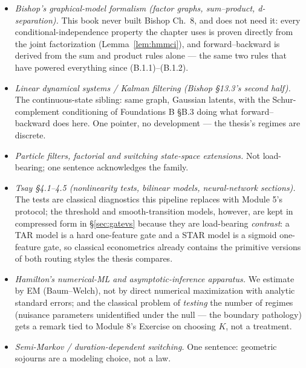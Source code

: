 \documentclass[11pt]{article}
\numberwithin{equation}{section}
\theoremstyle{plain}
\theoremstyle{definition}
\theoremstyle{remark}
\begin{document}
\begin{itemize}[leftmargin=2em,itemsep=0.15em]
\item \emph{Bishop's graphical-model formalism (factor graphs, sum--product, d-separation).} This book never built Bishop Ch.\ 8, and does not need it: every conditional-independence property the chapter uses is proven directly from the joint factorization (Lemma~\ref{lem:hmmci}), and forward--backward is derived from the sum and product rules alone --- the same two rules that have powered everything since (B.1.1)--(B.1.2).
\item \emph{Linear dynamical systems / Kalman filtering (Bishop \S13.3's second half).} The continuous-state sibling: same graph, Gaussian latents, with the Schur-complement conditioning of Foundations B \S B.3 doing what forward--backward does here. One pointer, no development --- the thesis's regimes are discrete.
\item \emph{Particle filters, factorial and switching state-space extensions.} Not load-bearing; one sentence acknowledges the family.
\item \emph{Tsay \S4.1--4.5 (nonlinearity tests, bilinear models, neural-network sections).} The tests are classical diagnostics this pipeline replaces with Module 5's protocol; the threshold and smooth-transition models, however, are kept in compressed form in \S\ref{sec:gatevs} because they are load-bearing \emph{contrast}: a TAR model is a hard one-feature gate and a STAR model is a sigmoid one-feature gate, so classical econometrics already contains the primitive versions of both routing styles the thesis compares.
\item \emph{Hamilton's numerical-ML and asymptotic-inference apparatus.} We estimate by EM (Baum--Welch), not by direct numerical maximization with analytic standard errors; and the classical problem of \emph{testing} the number of regimes (nuisance parameters unidentified under the null --- the boundary pathology) gets a remark tied to Module 8's Exercise on choosing $K$, not a treatment.
\item \emph{Semi-Markov / duration-dependent switching.} One sentence: geometric sojourns are a modeling choice, not a law.
\end{itemize}
\end{document}

